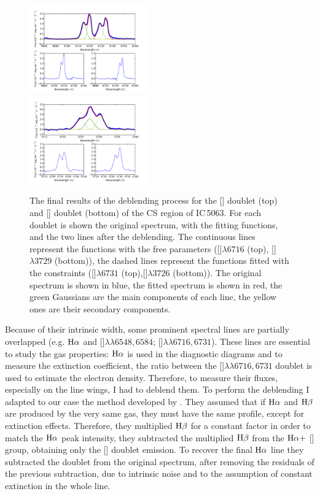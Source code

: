 \documentclass[../main.tex]{subfiles}
\begin{document}
\begin{figure}
\centering
\includegraphics[width=0.45\textwidth]{PhD_thesis/images/paper1/s2.pdf} \\
\vskip0.2cm
\includegraphics[width=0.45\textwidth]{PhD_thesis/images/paper1/o2.pdf}\\
\caption[]{The final results of the deblending process for the [] doublet (top) and [] doublet (bottom) of the CS region of IC\,5063. For each doublet is shown the original spectrum, with the fitting functions, and the two lines after the deblending. The continuous lines represent the functions with the free parameters ([]$\lambda6716$ (top), []$\lambda3729$ (bottom)), the dashed lines represent the functions fitted with the constraints ([]$\lambda6731$ (top),[]$\lambda3726$ (bottom)). The original spectrum is shown in blue, the fitted spectrum is shown in red, the green Gaussians are the main components of each line, the yellow ones are their secondary components. }
\label{fig:deb}
\end{figure}

Because of their intrinsic width, some prominent spectral lines are partially overlapped (e.g. $\rm H\alpha$ and []$\lambda\lambda6548,6584$; []$\lambda\lambda6716,6731$).
These lines are essential to study the gas properties: $\rm H\alpha$ is used in the diagnostic diagrams \citep{Baldwin81,Veilleux87}  and to measure the extinction coefficient, the ratio between the []$\lambda\lambda6716,6731$ doublet is used to estimate the electron density.
Therefore, to measure their fluxes, especially on the line wings, I had to deblend them.
To perform the deblending I adapted to our case the method developed by \citet{Schirmer13}.
They assumed that if $\rm H\alpha$ and $\rm H\beta$ are produced by the very same gas, they must have the same profile, except for extinction effects.
Therefore, they multiplied $\rm H\beta$ for a constant factor in order to match the $\rm H\alpha$ peak intensity, they subtracted the multiplied $\rm H\beta$ from the $\rm H\alpha +$ [] group, obtaining only the [] doublet emission.
To recover the final $\rm H\alpha$ line they subtracted the doublet from the original spectrum, after removing the residuals of the previous subtraction, due to intrinsic noise and to the assumption of constant extinction in the whole line.
\end{document}
